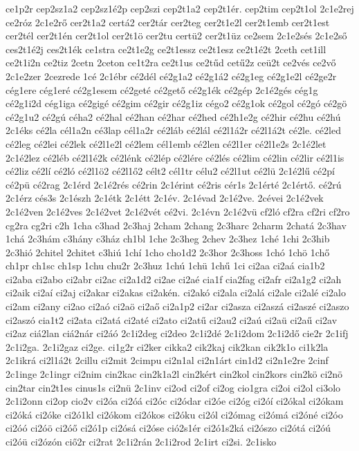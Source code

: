 {ce1p2r
cep2sz1a2
cep2sz1é2p
cep2szi
cep2t1a2
cep2t1ér.
cep2tim
cep2t1ol
2c1e2rej
ce2róz
2c1e2rő
cer2t1a2
certá2
cer2tár
cer2teg
cer2t1e2l
cer2t1emb
cer2t1est
cer2tél
cer2t1én
cer2t1ol
cer2t1ö
cer2tu
certü2
cer2t1üz
ce2sem
2c1e2sés
2c1e2ső
ces2t1é2j
ces2t1ék
ce1stra
ce2t1e2g
ce2t1essz
ce2t1esz
ce2t1é2t
2ceth
cet1ill
ce2t1i2n
ce2tiz
2cetn
2ceton
ce1t2ra
ce2t1us
ce2tűd
cetű2z
ceü2t
ce2vés
ce2vő
2c1e2zer
2cezrede
1cé
2c1ébr
cé2dél
cé2g1a2
cé2g1á2
cé2g1eg
cé2g1e2l
cé2ge2r
cég1ere
cég1eré
cé2g1esem
cé2geté
cé2gető
cé2g1ék
cé2gép
2c1é2gés
cég1g
cé2g1i2d
cég1iga
cé2gigé
cé2gim
cé2gir
cé2g1iz
cégo2
cé2g1ok
cé2gol
cé2gó
cé2gö
cé2g1u2
cé2gú
céha2
cé2hal
cé2han
cé2har
cé2hed
cé2h1e2g
cé2hir
cé2hu
cé2hú
2c1éks
cé2la
cél1a2n
cé3lap
cél1a2r
cé2láb
cé2lál
cé2l1á2r
cé2l1á2t
cé2le.
cé2led
cé2leg
cé2lei
cé2lek
cé2l1e2l
cé2lem
cél1emb
cé2len
cé2l1er
cé2l1e2s
2c1é2let
2c1é2lez
cé2léb
cé2l1é2k
cé2lénk
cé2lép
cé2lére
cé2lés
cé2lim
cé2lin
cé2lir
cé2l1is
cé2liz
cé2lí
cé2ló
cé2l1ö2
cé2l1ő2
célt2
cél1tr
célu2
cé2l1ut
cé2lü
2c1é2lű
cé2pí
cé2pü
cé2rag
2c1érd
2c1é2rés
cé2rin
2c1érint
cé2ris
cér1s
2c1érté
2c1értő.
cé2rú
2c1érz
cés3s
2c1észh
2c1étk
2c1étt
2c1év.
2c1évad
2c1é2ve.
2cévei
2c1é2vek
2c1é2ven
2c1é2ves
2c1é2vet
2c1é2vét
cé2vi.
2c1évn
2c1é2vü
cf2ló
cf2ra
cf2ri
cf2ro
cg2ra
cg2ri
c2h
1cha
c3had
2c3haj
2cham
2chang
2c3harc
2charm
2chatá
2c3hav
1chá
2c3hám
c3hány
c3ház
ch1bl
1che
2c3heg
2chev
2c3hez
1ché
1chi
2c3hib
2c3hió
2chitel
2chitet
c3hiú
1chí
1cho
cho1d2
2c3hor
2c3hoss
1chó
1chö
1chő
ch1pr
ch1sc
ch1sp
1chu
chu2r
2c3huz
1chú
1chü
1chű
1ci
ci2aa
ci2aá
cia1b2
ci2aba
ci2abo
ci2abr
ci2ac
ci2a1d2
ci2ae
ci2aé
cia1f
cia2fag
ci2afr
ci2a1g2
ci2ah
ci2aik
ci2aí
ci2aj
ci2akar
ci2akas
ci2akén.
ci2akó
ci2ala
ci2alá
ci2ale
ci2alé
ci2alo
ci2am
ci2any
ci2ao
ci2aó
ci2aö
ci2aő
ci2a1p2
ci2ar
ci2asza
ci2aszá
ci2aszé
ci2aszo
ci2aszó
cia1t2
ci2ata
ci2atá
ci2até
ci2ato
ci2atű
ci2au2
ci2aú
ci2aü
ci2aű
ci2av
ci2az
ciá2lan
ciá2nár
ci2áó
2c1i2deg
ci2deo
2c1i2dé
2c1i2dom
2c1i2dő
cie2r
2c1ifj
2c1i2ga.
2c1i2gaz
ci2ge.
ci1g2r
ci2ker
cikka2
cik2kaj
cik2kan
cik2k1o
ci1k2la
2c1ikrá
ci2l1á2t
2cillu
ci2mit
2cimpu
ci2n1al
ci2n1árt
cin1d2
ci2n1e2re
2cinf
2c1inge
2c1ingr
ci2nim
cin2kac
cin2k1a2l
cin2kért
cin2kol
cin2kors
cin2kö
ci2nö
cin2tar
cin2t1es
cinus1s
ci2nü
2c1inv
ci2od
ci2of
ci2og
cio1gra
ci2oi
ci2ol
ci3olo
2c1i2onn
ci2op
cio2v
ci2óa
ci2óá
ci2óc
ci2ódar
ci2óe
ci2óg
ci2óí
ci2ókal
ci2ókam
ci2óká
ci2óke
ci2ó1kl
ci2ókom
ci2ókos
ci2óku
ci2ól
ci2ómag
ci2ómá
ci2óné
ci2óo
ci2óó
ci2óö
ci2óő
ci2ó1p
ci2ósá
ci2óse
ció2s1ér
ci2ó1s2ká
ci2ószo
ci2ótá
ci2óú
ci2óü
ci2ózón
ciő2r
ci2rat
2c1i2rán
2c1i2rod
2c1irt
ci2si.
2c1isko
}
